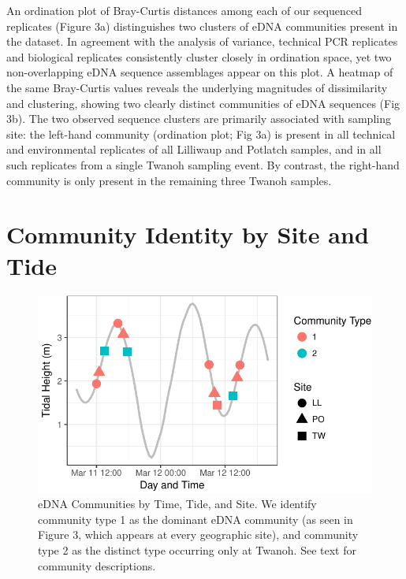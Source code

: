 \documentclass[fleqn,10pt,lineno]{wlpeerj} %
\begin{document}
An ordination plot of Bray-Curtis distances among each of our sequenced
replicates (Figure 3a) distinguishes two clusters of eDNA communities
present in the dataset. In agreement with the analysis of variance,
technical PCR replicates and biological replicates consistently cluster
closely in ordination space, yet two non-overlapping eDNA sequence
assemblages appear on this plot. A heatmap of the same Bray-Curtis
values reveals the underlying magnitudes of dissimilarity and
clustering, showing two clearly distinct communities of eDNA sequences
(Fig 3b). The two observed sequence clusters are primarily associated
with sampling site: the left-hand community (ordination plot; Fig 3a) is
present in all technical and environmental replicates of all Lilliwaup
and Potlatch samples, and in all such replicates from a single Twanoh
sampling event. By contrast, the right-hand community is only present in
the remaining three Twanoh samples.

\section{Community Identity by Site and
Tide}\label{community-identity-by-site-and-tide-1}

\begin{figure}

{\centering \includegraphics{figures/tide_community_figure-1} 

}

\caption{\label{fig:fig4}eDNA Communities by Time, Tide, and Site. We identify community type 1 as the dominant eDNA community (as seen in Figure 3, which appears at every geographic site), and community type 2 as the distinct type occurring only at Twanoh. See text for community descriptions.}\label{fig:tide_community_figure}
\end{figure}
\end{document}
